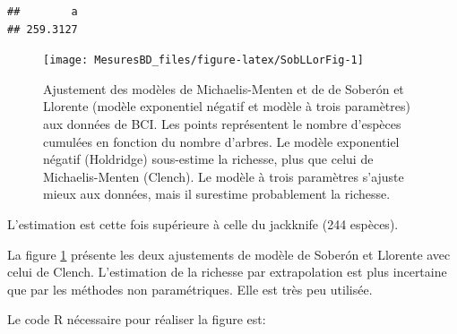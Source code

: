 \documentclass[
  11pt,
  american,
  a4paper,
  extrafontsizes,onecolumn,openright
  ]{memoir}
\begin{document}
\begin{verbatim}
##        a 
## 259.3127
\end{verbatim}

\normalsize



\scriptsize

\begin{figure}

{\centering \texttt{[image: MesuresBD\_files/figure-latex/SobLLorFig-1]} 

}

\caption{Ajustement des modèles de Michaelis-Menten et de de Soberón et Llorente (modèle exponentiel négatif et modèle à trois paramètres) aux données de BCI. Les points représentent le nombre d'espèces cumulées en fonction du nombre d'arbres. Le modèle exponentiel négatif (Holdridge) sous-estime la richesse, plus que celui de Michaelis-Menten (Clench). Le modèle à trois paramètres s'ajuste mieux aux données, mais il surestime probablement la richesse.}\label{fig:SobLLorFig}
\end{figure}

\normalsize

L'estimation est cette fois supérieure à celle du jackknife (244 espèces).

La figure \ref{fig:SobLLorFig} présente les deux ajustements de modèle de Soberón et Llorente avec celui de Clench.
L'estimation de la richesse par extrapolation est plus incertaine que par les méthodes non paramétriques.
Elle est très peu utilisée.

Le code R nécessaire pour réaliser la figure est:

\scriptsize
\end{document}
